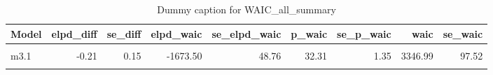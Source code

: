 \begin{table}
\centering
\caption{Dummy caption for WAIC_all_summary}
\centering
\fontsize{10}{12}\selectfont
\begin{tabular}[t]{lrrrrrrrr}
\toprule
Model & elpd\_diff & se\_diff & elpd\_waic & se\_elpd\_waic & p\_waic & se\_p\_waic & waic & se\_waic\\
\midrule
\cellcolor{gray!10}{m2} & \cellcolor{gray!10}{0.00} & \cellcolor{gray!10}{0.00} & \cellcolor{gray!10}{-1673.28} & \cellcolor{gray!10}{48.72} & \cellcolor{gray!10}{32.07} & \cellcolor{gray!10}{1.34} & \cellcolor{gray!10}{3346.57} & \cellcolor{gray!10}{97.44}\\
m3.1 & -0.21 & 0.15 & -1673.50 & 48.76 & 32.31 & 1.35 & 3346.99 & 97.52\\
\cellcolor{gray!10}{m4} & \cellcolor{gray!10}{-2.97} & \cellcolor{gray!10}{1.31} & \cellcolor{gray!10}{-1676.25} & \cellcolor{gray!10}{48.82} & \cellcolor{gray!10}{36.14} & \cellcolor{gray!10}{1.57} & \cellcolor{gray!10}{3352.50} & \cellcolor{gray!10}{97.63}\\
\bottomrule
\end{tabular}
\end{table}
